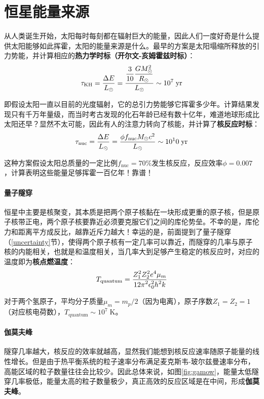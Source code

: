 \documentclass[openany]{ctexbook}
\begin{document}
\section{恒星能量来源}
从人类诞生开始，太阳每时每刻都在辐射巨大的能量，因此人们一度好奇是什么提供太阳能够如此挥霍，太阳的能量来源是什么。最早的方案是太阳塌缩所释放的引力势能，并计算相应的\textbf{热力学时标（开尔文-亥姆霍兹时标）}：
\begin{equation}
  \tau_\mathrm{KH}={\Delta E\over L_\odot}={\displaystyle{3\over10}{GM^2_\odot \over R_\odot}\over L_\odot}\sim10^7\;\mathrm{yr}
\end{equation}

即假设太阳一直以目前的光度辐射，它的总引力势能够它挥霍多少年。计算结果发现只有千万年量级，而当时考古发现的化石年龄已经有数十亿年，难道地球形成比太阳还早？显然不太可能，因此有人的注意力转向了核能，并计算了\textbf{核反应时标}：
\begin{equation}
  \tau_\mathrm{nuc}={\Delta E\over L_\odot}={\phi f_\mathrm{nuc}M_\odot c^2 \over L_\odot}\sim10^10\;\mathrm{yr}
\end{equation}

这种方案假设太阳总质量的一定比例$f_\mathrm{nuc}=70\%$发生核反应，反应效率$\phi=0.007$，计算表明这些能量足够挥霍一百亿年！靠谱！

\paragraph{量子隧穿}
恒星中主要是核聚变，其本质是把两个原子核黏在一块形成更重的原子核，但是原子核带正电，两个原子核要靠近必须要克服它们之间的库伦势垒。不幸的是，库伦力和距离平方成反比，越靠近斥力越大！幸运的是，前面提到了量子隧穿（\ref{uncertainty}节），使得两个原子核有一定几率可以靠近，而隧穿的几率与原子核的内能相关，也就是和温度相关，当几率大到足够产生稳定的核反应时，对应的温度即为\textbf{核点燃温度}：
\begin{equation}
  T_\mathrm{quantum}={\displaystyle Z_1^2 Z_2^2 e^4 \mu_m \over \displaystyle 12\pi^2 \epsilon^2_0 h^2 k}
\end{equation}

对于两个氢原子，平均分子质量$\mu_m=m_p/2$（因为电离），原子序数$Z_1=Z_2=1$（对应核电荷数），$T_\mathrm{quantum}\sim10^7\;\mathrm K$。

\paragraph{伽莫夫峰}
隧穿几率越大，核反应的效率就越高，显然我们能想到核反应速率随原子能量的线性增长。但是由于热平衡系统的粒子速率分布满足麦克斯韦-玻尔兹曼速率分布，高能区域的粒子数量往往会比较少。因此总体来说，如图\ref{fig:gamow}，能量太低隧穿几率极低，能量太高的粒子数量极少，真正高效的反应区域是在中间，形成\textbf{伽莫夫峰}。
\end{document}
